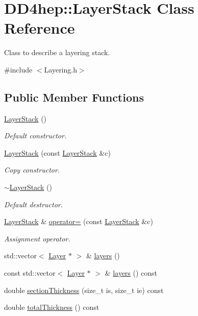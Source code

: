 \hypertarget{class_d_d4hep_1_1_layer_stack}{
\section{DD4hep::LayerStack Class Reference}
\label{class_d_d4hep_1_1_layer_stack}
}


Class to describe a layering stack.  


{\ttfamily \#include $<$Layering.h$>$}\subsection*{Public Member Functions}
\begin{DoxyCompactItemize}
\item 
\hyperlink{class_d_d4hep_1_1_layer_stack_a802229c0f548c9e506b8fa6544d54563}{LayerStack} ()
\begin{DoxyCompactList}\small\item\em Default constructor. \item\end{DoxyCompactList}\item 
\hyperlink{class_d_d4hep_1_1_layer_stack_a1eb37df2698ed881e8b3fe10fc418135}{LayerStack} (const \hyperlink{class_d_d4hep_1_1_layer_stack}{LayerStack} \&c)
\begin{DoxyCompactList}\small\item\em Copy constructor. \item\end{DoxyCompactList}\item 
\hyperlink{class_d_d4hep_1_1_layer_stack_a945f22b1f52e382128b80e16f56f68fa}{$\sim$LayerStack} ()
\begin{DoxyCompactList}\small\item\em Default destructor. \item\end{DoxyCompactList}\item 
\hyperlink{class_d_d4hep_1_1_layer_stack}{LayerStack} \& \hyperlink{class_d_d4hep_1_1_layer_stack_ae660afcfb9b79db69cc225dc5d748216}{operator=} (const \hyperlink{class_d_d4hep_1_1_layer_stack}{LayerStack} \&c)
\begin{DoxyCompactList}\small\item\em Assignment operator. \item\end{DoxyCompactList}\item 
std::vector$<$ \hyperlink{class_d_d4hep_1_1_layer}{Layer} $\ast$ $>$ \& \hyperlink{class_d_d4hep_1_1_layer_stack_a66ac953919c08520ef1aa9da93f5aa1b}{layers} ()
\item 
const std::vector$<$ \hyperlink{class_d_d4hep_1_1_layer}{Layer} $\ast$ $>$ \& \hyperlink{class_d_d4hep_1_1_layer_stack_af832442ae51c7e8286c43040ba127a7e}{layers} () const 
\item 
double \hyperlink{class_d_d4hep_1_1_layer_stack_af47ac0d3a243e46d40e4e52792394489}{sectionThickness} (size\_\-t is, size\_\-t ie) const 
\item 
double \hyperlink{class_d_d4hep_1_1_layer_stack_af99b4e02da1c3ae6f31d63eb27e9fce7}{totalThickness} () const 
\end{DoxyCompactItemize}
